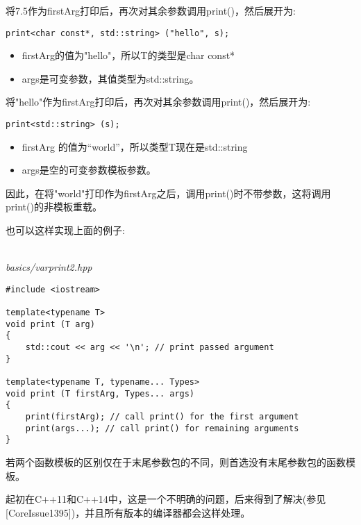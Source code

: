 将7.5作为firstArg打印后，再次对其余参数调用print()，然后展开为:

\begin{lstlisting}[style=styleCXX]
print<char const*, std::string> ("hello", s);
\end{lstlisting}

\begin{itemize}
\item 
firstArg的值为"hello"，所以T的类型是char const*

\item 
args是可变参数，其值类型为std::string。
\end{itemize}

将"hello"作为firstArg打印后，再次对其余参数调用print()，然后展开为:

\begin{lstlisting}[style=styleCXX]
print<std::string> (s);
\end{lstlisting}

\begin{itemize}
\item 
firstArg 的值为“world”，所以类型T现在是std::string

\item 
args是空的可变参数模板参数。
\end{itemize}

因此，在将"world"打印作为firstArg之后，调用print()时不带参数，这将调用print()的非模板重载。


也可以这样实现上面的例子:

\hspace*{\fill} \\ %
\noindent
\textit{basics/varprint2.hpp}
\begin{lstlisting}[style=styleCXX]
#include <iostream>

template<typename T>
void print (T arg)
{
	std::cout << arg << '\n'; // print passed argument
}

template<typename T, typename... Types>
void print (T firstArg, Types... args)
{
	print(firstArg); // call print() for the first argument
	print(args...); // call print() for remaining arguments
}
\end{lstlisting}

若两个函数模板的区别仅在于末尾参数包的不同，则首选没有末尾参数包的函数模板。

\begin{tcolorbox}[colback=webgreen!5!white,colframe=webgreen!75!black]
\hspace*{0.75cm}起初在C++11和C++14中，这是一个不明确的问题，后来得到了解决(参见[CoreIssue1395])，并且所有版本的编译器都会这样处理。
\end{tcolorbox}

